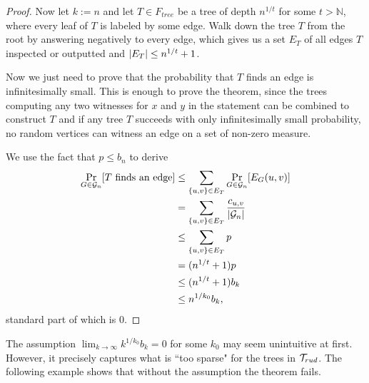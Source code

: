 \begin{proof}
Now let $k:=n$ and let $T\in F_{tree}$ be a tree of depth $n^{1/t}$ for some $t>\mathbb{N}$, where every leaf of $T$ is labeled by some edge. Walk down the tree $T$ from the root by answering negatively to every edge, which gives us a set $E_T$ of all edges $T$ inspected or outputted and $\left|{E_T}\right|\leq n^{1/t}+1$.

Now we just need to prove that the probability that $T$ finds an edge is infinitesimally small. This is enough to prove the theorem, since the trees computing any two witnesses for $x$ and $y$ in the statement can be combined to construct $T$ and if any tree $T$ succeeds with only infinitesimally small probability, no random vertices can witness an edge on a set of non-zero measure.

We use the fact that $p\leq b_n$ to derive 
\begin{align}
\Pr_{G\in\mathcal{G}_n}[T\text{ finds an edge}]&\leq \sum_{\{u,v\}\in E_T} \Pr_{G\in \mathcal{G}_n}[E_G(u,v)]\\
&=\sum_{\{u,v\}\in E_T} \frac{c_{u,v}}{\left|{\mathcal{G}_n}\right|}\\
&\leq\sum_{\{u,v\}\in E_T} p\\
&=(n^{1/t}+1)p\\
&\leq(n^{1/t}+1)b_k\\
&\leq n^{1/k_0}b_k,
\end{align}
standard part of which is $0$.
\end{proof}

The assumption $\lim_{k\to \infty} k^{1/k_0}b_k=0$ for some $k_0$ may seem unintuitive at first. However, it precisely captures what is ``too sparse" for the trees in $\mathcal{T}_{rud}$. The following example shows that without the assumption the theorem fails.

